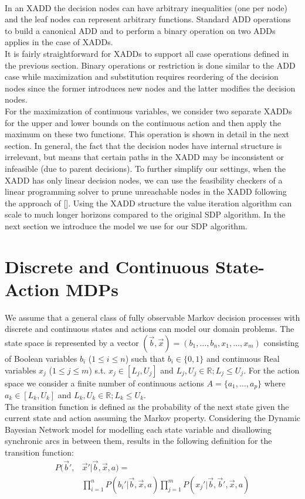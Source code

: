 \documentclass[letterpaper]{article}
\renewcommand{\-}{\text{-}}
\begin{document}
\\In an XADD the decision nodes can have arbitrary inequalities (one
per node) and the leaf nodes can represent arbitrary functions.
Standard ADD operations to build a canonical ADD and 
to perform a binary operation on two ADDs applies in the case of XADDs.
\\
It is fairly straightforward for XADDs to support all case operations defined in the previous section. 
Binary operations or restriction is done similar to the ADD case while maximization and substitution 
requires reordering of the decision nodes since the former introduces new nodes and the latter modifies
the decision nodes. \\
For the maximization of continuous variables, we consider two separate XADDs for the 
upper and lower bounds on the continuous action and then apply the maximum on these two functions. 
This operation is shown in detail in the next section. 
In general, the fact that the decision nodes have internal structure is irrelevant, but means that certain 
paths in the XADD may be inconsistent or infeasible (due to parent decisions).  To further simplify our settings, 
when the XADD has only linear decision nodes, we can use the feasibility checkers of a linear programming solver 
to prune unreachable nodes in the XADD following the approach of []. Using the XADD structure the value
iteration algorithm can scale to much longer horizons compared to the original SDP algorithm. In the next section we introduce the model we use for our SDP algorithm.

\section{Discrete and Continuous State-Action MDPs}

We assume that a general class of fully observable Markov decision processes with discrete and continuous states and actions can model our domain problems.
 The state space is represented by a vector $(\vec{b},\vec{x}) = ( b_1,\ldots,b_n,x_{1},\ldots,x_m )$ consisting of Boolean variables
 $b_i$ ($1 \leq i \leq n$) such that $b_i \in \{ 0,1 \}$ and continuous Real variables $x_j$ ($1 \leq j \leq m$) s.t. $x_j \in [L_j,U_j]$ and $L_j,U_j \in
\mathbb{R}; L_j \leq U_j$.  For the action space we consider a finite number of continuous actions $A
= \{ a_1, \ldots, a_p \}$ where $a_k \in [L_k,U_k]$ and $L_k,U_k \in
\mathbb{R}; L_k \leq U_k$.
\\
The transition function is defined as the probability of the next state given the current state and action assuming the Markov property.  Considering the Dynamic Bayesian Network model for modelling each state variable and disallowing synchronic arcs in between them,  results in the following definition for the transition function:   
\begin{align}
P(\vec{b}',&\vec{x}'|\vec{b},\vec{x},a) = \label{eq:dbn} \\
& \prod_{i=1}^n P(b_i'|\vec{b},\vec{x},a) \prod_{j=1}^m P(x_j'|\vec{b},\vec{b}',\vec{x},a) \nonumber 
\end{align}
\end{document}
